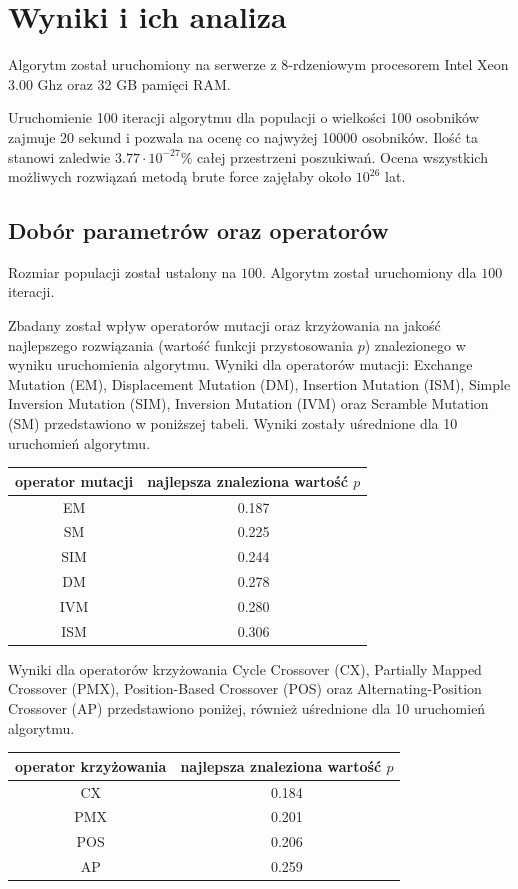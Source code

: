 \documentclass[brudnopis]{xmgr}
\begin{document}
\chapter{Wyniki i ich analiza}

Algorytm został uruchomiony na serwerze z 8-rdzeniowym procesorem Intel Xeon 3.00 Ghz oraz 32 GB pamięci RAM.

Uruchomienie 100 iteracji algorytmu dla populacji o wielkości 100 osobników zajmuje 20 sekund i pozwala na ocenę co najwyżej 10000 osobników. Ilość ta stanowi zaledwie $ 3.77 \cdot 10^{-27} \% $ całej przestrzeni poszukiwań. Ocena wszystkich możliwych rozwiązań metodą brute force zajęłaby około $ 10^{26} $ lat.

\section{Dobór parametrów oraz operatorów}

Rozmiar populacji został ustalony na $100$. Algorytm został uruchomiony dla $100$ iteracji.

Zbadany został wpływ operatorów mutacji oraz krzyżowania na jakość najlepszego rozwiązania (wartość funkcji przystosowania $p$) znalezionego w wyniku uruchomienia algorytmu. Wyniki dla operatorów mutacji: Exchange Mutation (EM), Displacement Mutation (DM), Insertion Mutation (ISM), Simple Inversion Mutation (SIM), Inversion Mutation (IVM) oraz Scramble Mutation (SM) przedstawiono w poniższej tabeli. Wyniki zostały uśrednione dla 10 uruchomień algorytmu.\newline\newline
\begin{tabular}{ c | c }
  operator mutacji & najlepsza znaleziona wartość $p$ \\
  \hline
  EM &	0.187 \\
  SM &	0.225 \\
  SIM &	0.244 \\
  DM &	0.278 \\
  IVM &	0.280 \\
  ISM &	0.306 \\
\end{tabular}\newline

Wyniki dla operatorów krzyżowania Cycle Crossover (CX), Partially Mapped Crossover (PMX), Position-Based Crossover (POS) oraz Alternating-Position Crossover (AP) przedstawiono poniżej, również uśrednione dla 10 uruchomień algorytmu.

\begin{tabular}{ c | c }
  operator krzyżowania & najlepsza znaleziona wartość $p$ \\
  \hline
  CX &	0.184 \\
  PMX &	0.201 \\
  POS &	0.206 \\
  AP &	0.259 \\
\end{tabular}\newline
\end{document}
